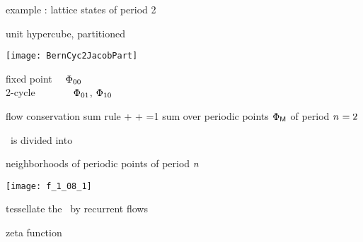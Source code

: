 \begin{frame}{example : lattice states of period 2}
    \begin{block}{unit hypercube, partitioned}
\begin{center}
            \begin{minipage}[c]{0.32\textwidth}\begin{center}
\texttt{[image: BernCyc2JacobPart]}
            \end{center}\end{minipage}
            \hspace{2ex}
            \begin{minipage}[c]{0.46\textwidth}
fixed point ~~$\Phi_{00}$\\
2-cycle ~~~~~~~$\Phi_{01}$, $\Phi_{10}$
            \end{minipage}
\end{center}
    \end{block}
\medskip

\begin{block}{
 {flow
conservation} sum rule
            }
\beq
   +    
   + 
    =1
\eeq
    {\footnotesize
sum over periodic points $\Phi_{\mathsf{M}}$ of period ${n_{}}=2$
    }
\end{block}

\statesp\ is divided into

\hfill
{\color{blue}neighborhoods} of periodic points of period ${n_{}}$
\end{frame} %

\begin{frame}{}
\begin{center}
\texttt{[image: f\_1\_08\_1]}
\end{center}
 tessellate the \statesp\ by {\Large recurrent flows}
\end{frame} %

\begin{frame}{}
\begin{center}
{\huge zeta function}
\end{center}
\vfill
\end{frame} %

